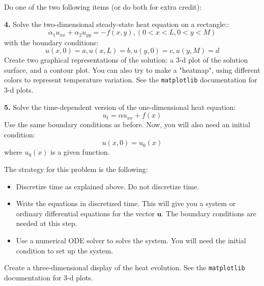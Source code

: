 \documentclass[12pt]{article}
\begin{document}
Do one of the two following items (or do both for extra credit):

\textbf{4.} Solve the two-dimensional steady-state heat equation on a rectangle::
\[
\alpha_1 u_{xx}+ \alpha_2 u_{yy}=-f(x,y), (0< x < L, 0< y< M)
\]
with the boundary conditions:
\[
u(x,0)=a, u(x,L)=b, u(y,0)=c, u(y,M)=d
\]
Create two graphical representations of the solution: a 3-d plot of the solution surface, and a contour plot. You can also try to make a "heatmap", using different colors to represent temperature variation. See the \texttt{matplotlib} documentation for 3-d plots.

\textbf{5.} Solve the time-dependent version of the one-dimensional heat equation:
\[
u_t=\alpha u_{xx}+f(x)
\]
Use the same boundary conditions as before. Now, you will also need an initial condition:
\[
u(x,0)=u_0(x)
\]
where $u_0(x)$ is a given function.

The strategy for this problem is the following:
\begin{itemize}
\item Discretize time as explained above. Do not discretize time.
\item Write the equations in discretized time. This will give you a system or ordinary differential equations for the vector $\textbf{u}$. The boundary conditions are needed at this step.
\item Use a numerical ODE solver to solve the system. You will need the initial condition to set up the system.
\end{itemize}
Create a three-dimensional display of the heat evolution. See the \texttt{matplotlib} documentation for 3-d plots.
\end{document}
